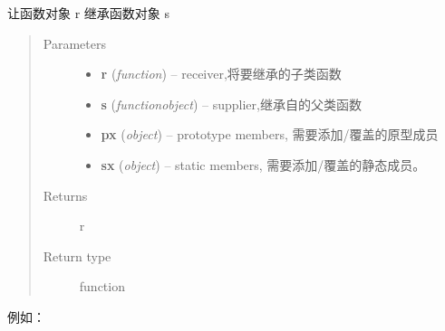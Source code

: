 \documentclass[letterpaper,10pt,english]{sphinxmanual}
\begin{document}
\begin{fulllineitems}
\label{api/seed/kissy/extend:Seed.KISSY.extend}
让函数对象 r 继承函数对象 s
\begin{quote}\begin{description}
\item[{Parameters}] \leavevmode\begin{itemize}
\item {}
\textbf{r} (\emph{function}) -- receiver,将要继承的子类函数

\item {}
\textbf{s} (\emph{function\textbar{}object}) -- supplier,继承自的父类函数

\item {}
\textbf{px} (\emph{object}) -- prototype members, 需要添加/覆盖的原型成员

\item {}
\textbf{sx} (\emph{object}) -- static members, 需要添加/覆盖的静态成员。

\end{itemize}

\item[{Returns}] \leavevmode
r

\item[{Return type}] \leavevmode
function

\end{description}\end{quote}

\end{fulllineitems}


例如：
\end{document}

